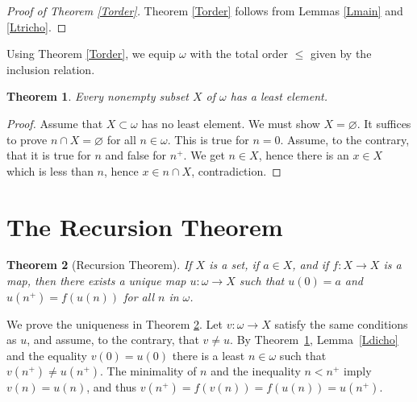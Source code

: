 \documentclass[12pt,letterpaper]{article}
\newtheorem{thm}{Theorem}%
\begin{document}
\begin{proof}[Proof of Theorem \ref{Torder}] 
Theorem \ref{Torder} follows from Lemmas \ref{Lmain} and \ref{Ltricho}. 
\end{proof} 

Using Theorem \ref{Torder}, we equip \(\omega\) with the total order \(\le\) given by the inclusion relation.

\begin{thm}\label{Two} 
Every nonempty subset \(X\) of \(\omega\) has a least element. 
\end{thm} 
\begin{proof}
Assume that \(X\subset\omega\) has no least element. We must show \(X=\varnothing\). It suffices to prove \(n\cap X=\varnothing\) for all \(n\in\omega\). This is true for \(n=0\). Assume, to the contrary, that it is true for \(n\) and false for \(n^+\). We get \(n\in X\), hence there is an \(x\in X\) which is less than \(n\), hence \(x\in n\cap X\), contradiction. 
\end{proof} 

\section{The Recursion Theorem} %

\begin{thm}[Recursion Theorem]\label{Trec} 
If \(X\) is a set, if \(a\in X\), and if \(f:X\to X\) is a map, then there exists a unique map \(u:\omega\to X\) such that \(u(0)=a\) and \(u(n^+)=f(u(n))\) for all \(n\) in \(\omega\). 
\end{thm} 

We prove the uniqueness in Theorem \ref{Trec}. Let \(v:\omega\to X\) satisfy the same conditions as \(u\), and assume, to the contrary, that \(v\ne u\). By Theorem~\ref{Two}, Lemma~\ref{Ldicho} and the equality \(v(0)=u(0)\) there is a least \(n\in\omega\) such that \(v(n^+)\ne u(n^+)\). The minimality of \(n\) and the inequality \(n<n^+\) imply \(v(n)=u(n)\), and thus \(v(n^+)=f(v(n))=f(u(n))=u(n^+)\). 
\end{document}
